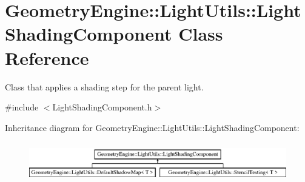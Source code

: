 \hypertarget{class_geometry_engine_1_1_light_utils_1_1_light_shading_component}{}\section{Geometry\+Engine\+::Light\+Utils\+::Light\+Shading\+Component Class Reference}
\label{class_geometry_engine_1_1_light_utils_1_1_light_shading_component}


Class that applies a shading step for the parent light.  




{\ttfamily \#include $<$Light\+Shading\+Component.\+h$>$}

Inheritance diagram for Geometry\+Engine\+::Light\+Utils\+::Light\+Shading\+Component\+:\begin{figure}[H]
\begin{center}
\leavevmode
\includegraphics[height=1.772152cm]{class_geometry_engine_1_1_light_utils_1_1_light_shading_component}
\end{center}
\end{figure}
